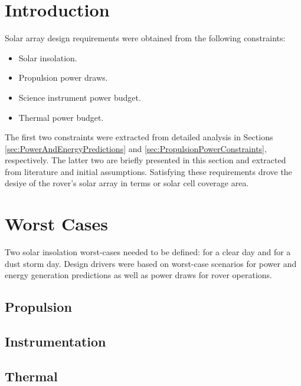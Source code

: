 \section{Introduction}
\label{sec:RequirementsAndDesignDrivers:Introduction}
Solar array design requirements were obtained from the following constraints:

\begin{itemize}
    \item Solar insolation.
    \item Propulsion power draws.
    \item Science instrument power budget.
    \item Thermal power budget.
\end{itemize}

The first two constraints were extracted from detailed analysis in Sections \ref{sec:PowerAndEnergyPredictions} and \ref{sec:PropulsionPowerConstraints}, respectively. The latter two are briefly presented in this section and extracted from literature and initial assumptions. Satisfying these requirements drove the desiye of the rover's solar array in terms or solar cell coverage area.

\section{Worst Cases}
\label{sec:RequirementsAndDesignDrivers:WorstCases}
Two solar insolation worst-cases needed to be defined: for a clear day and for a dust storm day.
Design drivers were based on worst-case scenarios for power and energy generation predictions as well as power draws for rover operations.

\subsection{Propulsion}
\label{sec:RequirementsAndDesignDrivers:WorstCases:Propulsion}

\subsection{Instrumentation}
\label{sec:RequirementsAndDesignDrivers:WorstCases:Instrumentation}

\subsection{Thermal}
\label{sec:RequirementsAndDesignDrivers:WorstCases:Thermal}

